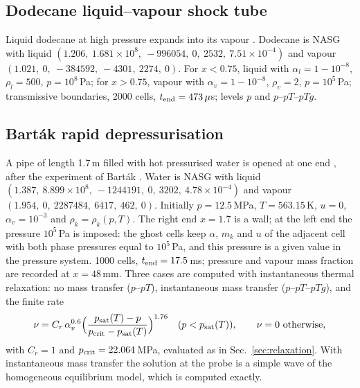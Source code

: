 \subsection{Dodecane liquid--vapour shock tube}
\label{sec:res_dodecane}
Liquid dodecane at high pressure expands into its vapour \cite[Sec.~8.2.2]{Pelanti2022}.
Dodecane is NASG with liquid $(1.206,\ 1.681\times10^8,\ -996054,\ 0,\ 2532,\ 7.51\times10^{-4})$ and vapour
$(1.021,\ 0,\ -384592,\ -4301,\ 2274,\ 0)$. For $x<0.75$, liquid with $\alpha_l=1-10^{-8}$, $\rho_l=500$, $p=10^8$\,Pa; for $x>0.75$,
vapour with $\alpha_v=1-10^{-8}$, $\rho_v=2$, $p=10^5$\,Pa; transmissive boundaries, 2000 cells, $t_{\rm end}=473\,\mu$s; levels $p$
and $p$--$pT$--$pTg$.

\subsection{Bart\'ak rapid depressurisation}
\label{sec:res_bartak}
A pipe of length 1.7\,m filled with hot pressurised water is opened at one end \cite[Sec.~8.2.4]{Pelanti2022}, after the experiment of Bart\'ak \cite{Bartak1990}. Water is
NASG with liquid $(1.387,\ 8.899\times10^8,\ -1244191,\ 0,\ 3202,\ 4.78\times10^{-4})$ and vapour $(1.954,\ 0,\ 2287484,\ 6417,\ 462,\ 0)$.
Initially $p=12.5$\,MPa, $T=563.15$\,K, $u=0$, $\alpha_v=10^{-3}$ and $\rho_k=\rho_k(p,T)$. The right end $x=1.7$ is a wall; at the
left end the pressure $10^5$\,Pa is imposed: the ghost cells keep $\alpha$, $m_k$ and $u$ of the adjacent cell with both
phase pressures equal to $10^5$\,Pa, and this pressure is a given value in the pressure system. 1000 cells,
$t_{\rm end}=17.5$\,ms; pressure and vapour mass fraction are recorded at $x=48$\,mm. Three cases are computed with
instantaneous thermal relaxation: no mass transfer ($p$--$pT$), instantaneous mass transfer ($p$--$pT$--$pTg$), and the
finite rate
\begin{equation}
\nu=C_r\,\alpha_v^{0.6}\Big(\frac{p_{\rm sat}(T)-p}{p_{\rm crit}-p_{\rm sat}(T)}\Big)^{1.76}\quad(p<p_{\rm sat}(T)),\qquad \nu=0\ \text{otherwise},
\label{eq:bartak_nu}
\end{equation}
with $C_r=1$ and $p_{\rm crit}=22.064$\,MPa, evaluated as in Sec.~\ref{sec:relaxation}. With instantaneous mass transfer the solution at the probe is a simple wave of the
homogeneous equilibrium model, which is computed exactly.

